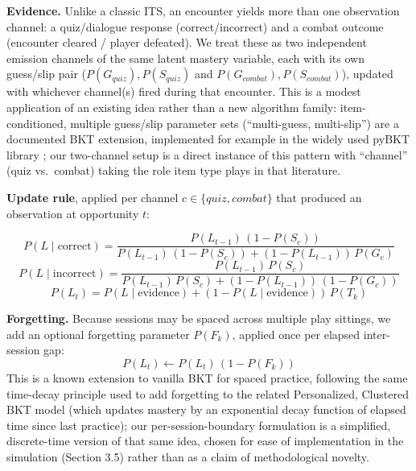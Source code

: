 \documentclass[11pt]{article}
\begin{document}
\textbf{Evidence.} Unlike a classic ITS, an encounter yields more than one observation channel: a quiz/dialogue response (correct/incorrect) and a combat outcome (encounter cleared / player defeated). We treat these as two independent emission channels of the same latent mastery variable, each with its own guess/slip pair ($P(G_{quiz}), P(S_{quiz})$ and $P(G_{combat}), P(S_{combat})$), updated with whichever channel(s) fired during that encounter. This is a modest application of an existing idea rather than a new algorithm family: item-conditioned, multiple guess/slip parameter sets (``multi-guess, multi-slip'') are a documented BKT extension, implemented for example in the widely used pyBKT library \cite{ref32}; our two-channel setup is a direct instance of this pattern with ``channel'' (quiz vs.\ combat) taking the role item type plays in that literature.

\textbf{Update rule}, applied per channel $c \in \{quiz, combat\}$ that produced an observation at opportunity $t$:

\begin{equation}
P(L \mid \text{correct}) = \frac{P(L_{t-1})\,(1 - P(S_c))}{P(L_{t-1})\,(1 - P(S_c)) + (1 - P(L_{t-1}))\,P(G_c)}
\end{equation}
\begin{equation}
P(L \mid \text{incorrect}) = \frac{P(L_{t-1})\,P(S_c)}{P(L_{t-1})\,P(S_c) + (1 - P(L_{t-1}))\,(1 - P(G_c))}
\end{equation}
\begin{equation}
P(L_t) = P(L \mid \text{evidence}) + (1 - P(L \mid \text{evidence}))\,P(T_k)
\end{equation}

\textbf{Forgetting.} Because sessions may be spaced across multiple play sittings, we add an optional forgetting parameter $P(F_k)$, applied once per elapsed inter-session gap:
\begin{equation}
P(L_t) \leftarrow P(L_t)\,(1 - P(F_k))
\end{equation}
This is a known extension to vanilla BKT for spaced practice, following the same time-decay principle used to add forgetting to the related Personalized, Clustered BKT model \cite{ref33} (which updates mastery by an exponential decay function of elapsed time since last practice); our per-session-boundary formulation is a simplified, discrete-time version of that same idea, chosen for ease of implementation in the simulation (Section 3.5) rather than as a claim of methodological novelty.
\end{document}
